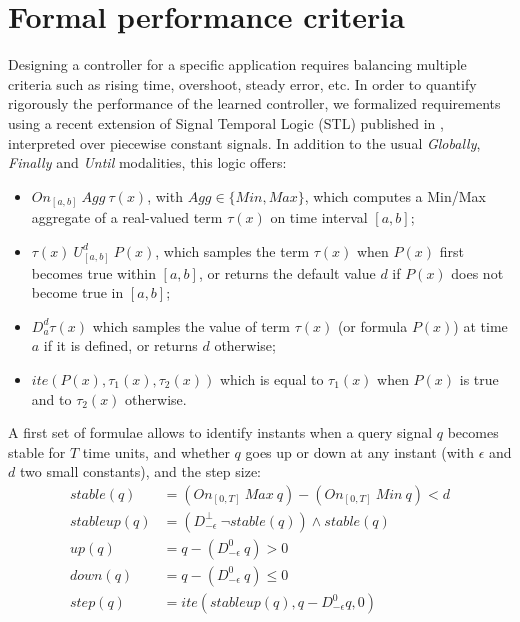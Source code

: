 \documentclass[anonymous=true,format=sigconf, screen=true, review=false]{acmart}
\newcommand{\stable}[0]{\mathit{stable}}
\newcommand{\becomesstable}[0]{\mathit{stableup}}
\newcommand{\up}[0]{\mathit{up}}
\newcommand{\down}[0]{\mathit{down}}
\newcommand{\ite}[0]{\mathit{ite}}
\newcommand{\On}[0]{\mathit{On}}
\newcommand{\Agg}[0]{\mathit{Agg}}
\newcommand{\MinAgg}[0]{\mathit{Min}}
\newcommand{\MaxAgg}[0]{\mathit{Max}}
\newcommand{\stepSize}[0]{\mathit{step}}
\begin{document}
\section{Formal performance criteria}
\label{sec:perf-observers}

Designing a controller for a specific application requires balancing multiple criteria such as rising time, overshoot, steady error, etc. 
In order to quantify rigorously the performance of the learned controller, we formalized requirements using a recent extension of 
Signal Temporal Logic (STL) published in \cite{2019bakhirkinbeyondstl}, interpreted over piecewise constant signals.
In addition to the usual \emph{Globally}, \emph{Finally} and \emph{Until} modalities, this logic offers:

\begin{itemize}
\item  $\On_{[a,b]} ~ \Agg  ~ \tau(x)$, with $\Agg \in \{\MinAgg, \MaxAgg\}$, which computes a Min/Max aggregate of a real-valued term $\tau(x)$ on time interval $[a,b]$;

\item $\tau(x) ~ U_{[a,b]}^d ~ P(x)$, which samples the term $\tau(x)$ when $P(x)$ first becomes true within $[a,b]$, or returns the default value $d$ if $P(x)$ does not become true in $[a,b]$;

\item $D_{a}^d \tau(x)$ which samples the value of term $\tau(x)$ (or formula $P(x)$) at time $a$ if it is defined, or returns $d$ otherwise;

\item $\ite(P(x), \tau_1(x), \tau_2(x))$ which is equal to $\tau_1(x)$ when $P(x)$ is true and to $\tau_2(x)$ otherwise.
\end{itemize}

A first set of formulae allows to identify instants when a query signal $q$ becomes stable for $T$ time units, 
and whether $q$ goes up or down at any instant (with $\epsilon$ and $d$ two small constants), and the step size:
\begin{align}
       \stable(q) &= (\On_{[0, T]} ~ \MaxAgg ~ q) - (\On_{[0, T]} ~ \MinAgg ~ q) < d\\
\becomesstable(q) &= (D_{-\epsilon}^\bot ~ \lnot \stable(q)) \land \stable(q)\\
           \up(q) &= q - (D_{-\epsilon}^0 ~ q) > 0 \\
         \down(q) &= q - (D_{-\epsilon}^0 ~ q) \leq 0 \\
        \stepSize(q) &= \ite(\becomesstable(q), q - D_{-\epsilon}^0{q}, 0) 
\end{align}
\end{document}

